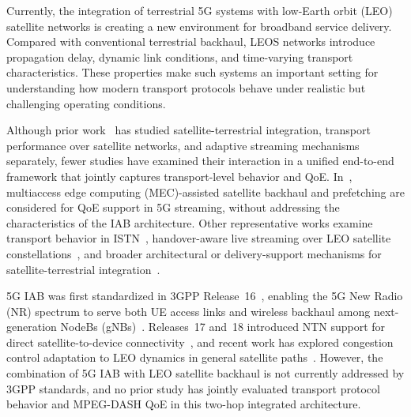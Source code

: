 \documentclass[journal]{IEEEtran}
\begin{document}
Currently, the integration of terrestrial 5G systems with low-Earth orbit (LEO) satellite networks is creating a new environment for broadband service delivery. Compared with conventional terrestrial backhaul, LEOS networks introduce propagation delay, dynamic link conditions, and time-varying transport characteristics. These properties make such systems an important setting for understanding how modern transport protocols behave under realistic but challenging operating conditions.

Although prior work~\cite{Kim2019,Ge2019,Wang2018,Fang2024,Alshagri2023,Yang2018} has studied satellite-terrestrial integration, transport performance over satellite networks, and adaptive streaming mechanisms separately, fewer studies have examined their interaction in a unified end-to-end framework that jointly captures transport-level behavior and QoE. In~\cite{Ge2019}, multiaccess edge computing (MEC)-assisted satellite backhaul and prefetching are considered for QoE support in 5G streaming, without addressing the characteristics of the IAB architecture. Other representative works examine transport behavior in ISTN~\cite{Alshagri2023,Yang2018}, handover-aware live streaming over LEO satellite constellations~\cite{Fang2024}, and broader architectural or delivery-support mechanisms for satellite-terrestrial integration~\cite{Kim2019,Wang2018}.  

5G IAB was first standardized in 3GPP Release~16~\cite{3GPP_TS_138_300_R16}, enabling the 5G New Radio (NR) spectrum to serve both UE access links and wireless backhaul among next-generation NodeBs (gNBs)~\cite{Leyva2020,Rinaldi2020}. Releases~17 and~18 introduced NTN support for direct satellite-to-device connectivity~\cite{3GPP_TR_38_821,3GPP_TR_23_700_27}, and recent work has explored congestion control adaptation to LEO dynamics in general satellite paths~\cite{Lai2025}. However, the combination of 5G IAB with LEO satellite backhaul is not currently addressed by 3GPP standards, and no prior study has jointly evaluated transport protocol behavior and MPEG-DASH QoE in this two-hop integrated architecture.
\end{document}
